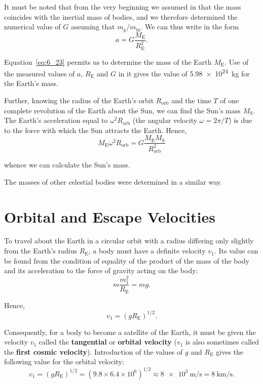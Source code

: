 It must be noted that from the very beginning we assumed in  that the mass coincides with the inertial mass of bodies, and we therefore determined the numerical value of $G$ assuming that $m_{\text{g}}/m_{\text{in}}$. We can thus write  in the form
\begin{equation}\label{eq:6_23}
	a = G\frac{M_{\text{E}}}{R_{\text{E}}^2}.
\end{equation}

\noindent
Equation~\eqref{eq:6_23} permits us to determine the mass of the Earth $M_{\text{E}}$. Use of the measured values of $a$, $R_{\text{E}}$ and $G$ in it gives the value of \SI{5.98e24}{\kilo\gram} for the Earth's mass.

Further, knowing the radius of the Earth's orbit $R_{\text{orb}}$ and the time $T$ of one complete revolution of the Earth about the Sun, we can find the Sun's mass $M_{\text{S}}$. The Earth's acceleration equal to $\omega^2R_{\text{orb}}$ (the angular velocity $\omega=2\pi/T$) is due to the force with which the Sun attracts the Earth. Hence,
\begin{equation*}
	M_{\text{E}}\omega^2R_{\text{orb}} = G\frac{M_{\text{E}}M_{\text{S}}}{R_{\text{orb}}^2}
\end{equation*}

\noindent
whence we can calculate the Sun's mass.

The masses of other celestial bodies were determined in a similar way.

\section{Orbital and Escape Velocities}\label{sec:6_4}

To travel about the Earth in a circular orbit with a radius differing only slightly from the Earth's radius $R_{\text{E}}$, a body must have a definite velocity $v_1$. Its value can be found from the condition of equality of the product of the mass of the body and its acceleration to the force of gravity acting on the body:
\begin{equation*}
	m\frac{m_1^2}{R_{\text{E}}} = mg.
\end{equation*}

\noindent
Hence,
\begin{equation}\label{eq:6_24}
	v_1 = (gR_{\text{E}})^{1/2}.
\end{equation}

Consequently, for a body to become a satellite of the Earth, it must be given the velocity $v_1$ called the \textbf{tangential} or \textbf{orbital velocity} ($v_1$ is also sometimes called the \textbf{first cosmic velocity}). Introduction of the values of $g$ and $R_{\text{E}}$ gives the following value for the orbital velocity:
\begin{equation*}
	v_1 = (gR_{\text{E}})^{1/2} = (9.8 \times 6.4 \times 10^6)^{1/2} \approx \SI{8e3}{\metre\per\second} = \SI{8}{\kilo\metre\per\second}.
\end{equation*}


